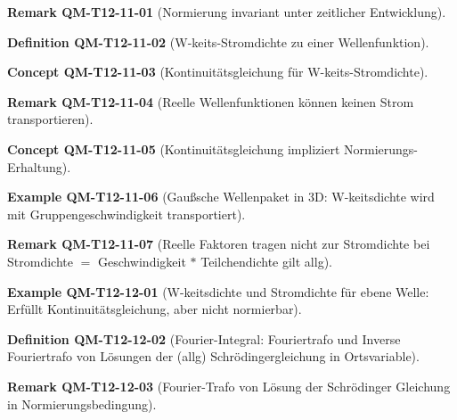 \documentclass[10pt, letterpaper]{article}
\newcommand{\CustomHeading}[3]{%
  \par\medskip\noindent%
  \textbf{#1 #2} \textnormal{(#3)}.\enskip%
}
\newenvironment{DEF}[2]{\CustomHeading{Definition}{#1}{#2}}{}
\newenvironment{REM}[2]{\CustomHeading{Remark}{#1}{#2}}{}
\newenvironment{EXA}[2]{\CustomHeading{Example}{#1}{#2}}{}
\newenvironment{CONC}[2]{\CustomHeading{Concept}{#1}{#2}}{}
\begin{document}
\begin{REM}{QM-T12-11-01}{Normierung invariant unter zeitlicher Entwicklung}
\end{REM}

\begin{DEF}{QM-T12-11-02}{W-keits-Stromdichte zu einer Wellenfunktion}
\end{DEF}

\begin{CONC}{QM-T12-11-03}{Kontinuitätsgleichung für W-keits-Stromdichte}
\end{CONC}

\begin{REM}{QM-T12-11-04}{Reelle Wellenfunktionen können keinen Strom transportieren}
\end{REM}

\begin{CONC}{QM-T12-11-05}{Kontinuitätsgleichung impliziert Normierungs-Erhaltung}
\end{CONC}

\begin{EXA}{QM-T12-11-06}{Gaußsche Wellenpaket in 3D: W-keitsdichte wird mit Gruppengeschwindigkeit transportiert}
\end{EXA}

\begin{REM}{QM-T12-11-07}{Reelle Faktoren tragen nicht zur Stromdichte bei 
Stromdichte $=$ Geschwindigkeit $*$ Teilchendichte gilt allg}
\end{REM}

\begin{EXA}{QM-T12-12-01}{W-keitsdichte und Stromdichte für ebene Welle: Erfüllt Kontinuitätsgleichung, aber nicht normierbar}
\end{EXA}

\begin{DEF}{QM-T12-12-02}{Fourier-Integral: Fouriertrafo und Inverse Fouriertrafo von Lösungen der (allg) Schrödingergleichung in Ortsvariable}
\end{DEF}

\begin{REM}{QM-T12-12-03}{Fourier-Trafo von Lösung der Schrödinger Gleichung in Normierungsbedingung}
\end{REM}
\end{document}
